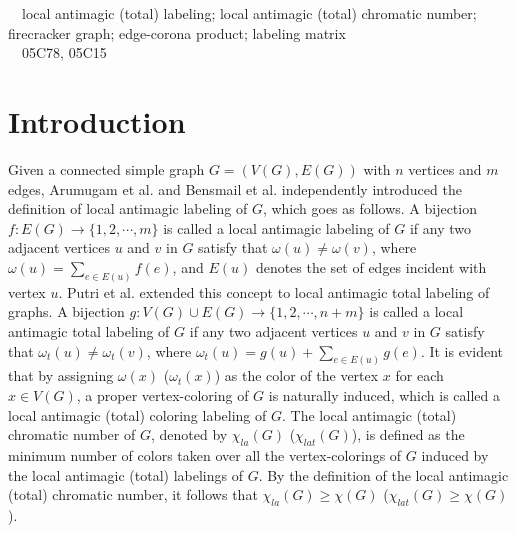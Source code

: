 \documentclass[12pt]{article}
\begin{document}
\ \ local antimagic (total) labeling; local antimagic (total) chromatic number; firecracker graph; edge-corona product; labeling matrix\\
\ \ 05C78, 05C15
\baselineskip=0.30in

\section{Introduction}

Given a connected simple graph $G=(V(G),E(G))$ with $n$ vertices and $m$ edges, Arumugam et al. \cite{Arumugam-1} and Bensmail et al. \cite{Bensmail} independently introduced
the definition of local antimagic labeling of $G$, which goes as follows. A bijection $f: E(G)\rightarrow\{1,2, \cdots, m\}$ is called a local antimagic labeling of $G$
if any two adjacent vertices $u$ and $v$ in $G$ satisfy that $\omega(u) \neq \omega(v)$, where $\omega(u)=\sum_{e\in E(u)}f(e)$, and $E(u)$ denotes the set of edges incident with vertex $u$.
Putri et al. \cite{Putri} extended this concept to local antimagic total labeling of graphs. A bijection $g: V(G)\cup E(G)\rightarrow\{1,2, \cdots, n+m\}$ is called
a local antimagic total labeling of $G$ if any two adjacent vertices $u$ and $v$ in $G$ satisfy that $\omega_{t}(u) \neq \omega_{t}(v)$, where $\omega_{t}(u)=g(u)+\sum_{e\in E(u)}g(e)$.
It is evident that by assigning $\omega(x)$ ($\omega_{t}(x)$) as the color of the vertex $x$ for each $x\in V(G)$, a proper vertex-coloring of $G$ is naturally induced, which is called a local antimagic (total) coloring labeling of $G$. 
The local antimagic (total) chromatic number \cite{Arumugam-1,Putri} of $G$, denoted by $\chi_{la}(G)$ ($\chi_{lat}(G)$), is defined as the minimum number of colors taken
over all the vertex-colorings of $G$ induced by the local antimagic (total) labelings of $G$. By the definition of the local antimagic (total) chromatic number,
it follows that $\chi_{la}(G)\geq \chi(G)$ ($\chi_{lat}(G)\geq \chi(G)$).
\end{document}
